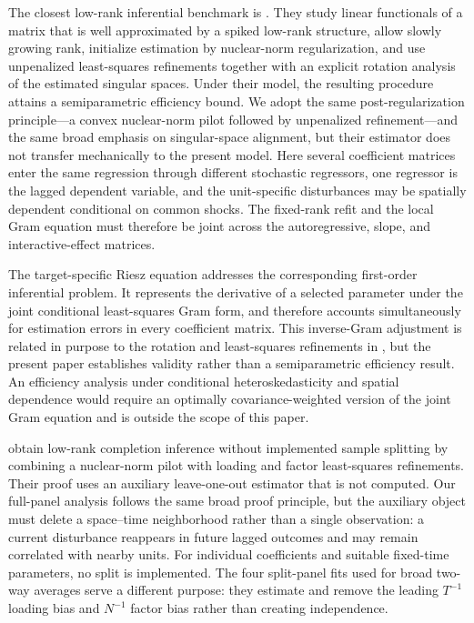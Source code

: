 \documentclass[11pt]{article}
\numberwithin{equation}{section}
\theoremstyle{remark}
\begin{document}
The closest low-rank inferential benchmark is \citet{chernozhukov2023}. They study linear functionals of a matrix that is well approximated by a spiked low-rank structure, allow slowly growing rank, initialize estimation by nuclear-norm regularization, and use unpenalized least-squares refinements together with an explicit rotation analysis of the estimated singular spaces. Under their model, the resulting procedure attains a semiparametric efficiency bound. We adopt the same post-regularization principle---a convex nuclear-norm pilot followed by unpenalized refinement---and the same broad emphasis on singular-space alignment, but their estimator does not transfer mechanically to the present model. Here several coefficient matrices enter the same regression through different stochastic regressors, one regressor is the lagged dependent variable, and the unit-specific disturbances may be spatially dependent conditional on common shocks. The fixed-rank refit and the local Gram equation must therefore be joint across the autoregressive, slope, and interactive-effect matrices.

The target-specific Riesz equation addresses the corresponding first-order inferential problem. It represents the derivative of a selected parameter under the joint conditional least-squares Gram form, and therefore accounts simultaneously for estimation errors in every coefficient matrix. This inverse-Gram adjustment is related in purpose to the rotation and least-squares refinements in \citet{chernozhukov2023}, but the present paper establishes validity rather than a semiparametric efficiency result. An efficiency analysis under conditional heteroskedasticity and spatial dependence would require an optimally covariance-weighted version of the joint Gram equation and is outside the scope of this paper.

\citet{choi2024} obtain low-rank completion inference without implemented sample splitting by combining a nuclear-norm pilot with loading and factor least-squares refinements. Their proof uses an auxiliary leave-one-out estimator that is not computed. Our full-panel analysis follows the same broad proof principle, but the auxiliary object must delete a space--time neighborhood rather than a single observation: a current disturbance reappears in future lagged outcomes and may remain correlated with nearby units. For individual coefficients and suitable fixed-time parameters, no split is implemented. The four split-panel fits used for broad two-way averages serve a different purpose: they estimate and remove the leading $T^{-1}$ loading bias and $N^{-1}$ factor bias rather than creating independence.
\end{document}
